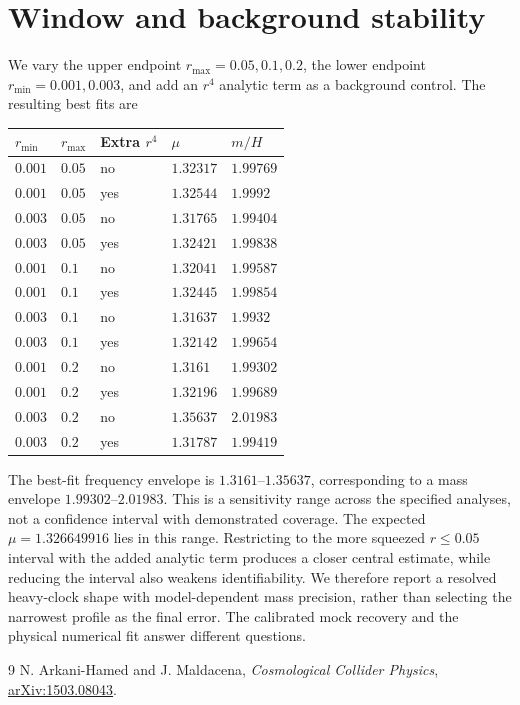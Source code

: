 \documentclass[11pt,a4paper]{article}
\begin{document}
\section{Window and background stability}
We vary the upper endpoint $r_{\max}=0.05,0.1,0.2$, the lower endpoint $r_{\min}=0.001,0.003$, and add an $r^4$ analytic term as a background control. The resulting best fits are
\begin{center}\small\begin{tabular}{lllll}\toprule $r_{\min}$ & $r_{\max}$ & Extra $r^4$ & $\mu$ & $m/H$\\\midrule
$0.001$ & $0.05$ & no & $1.32317$ & $1.99769$\\
$0.001$ & $0.05$ & yes & $1.32544$ & $1.9992$\\
$0.003$ & $0.05$ & no & $1.31765$ & $1.99404$\\
$0.003$ & $0.05$ & yes & $1.32421$ & $1.99838$\\
$0.001$ & $0.1$ & no & $1.32041$ & $1.99587$\\
$0.001$ & $0.1$ & yes & $1.32445$ & $1.99854$\\
$0.003$ & $0.1$ & no & $1.31637$ & $1.9932$\\
$0.003$ & $0.1$ & yes & $1.32142$ & $1.99654$\\
$0.001$ & $0.2$ & no & $1.3161$ & $1.99302$\\
$0.001$ & $0.2$ & yes & $1.32196$ & $1.99689$\\
$0.003$ & $0.2$ & no & $1.35637$ & $2.01983$\\
$0.003$ & $0.2$ & yes & $1.31787$ & $1.99419$\\\bottomrule\end{tabular}\end{center}
The best-fit frequency envelope is $1.3161$--$1.35637$, corresponding to a mass envelope $1.99302$--$2.01983$. This is a sensitivity range across the specified analyses, not a confidence interval with demonstrated coverage.
The expected $\mu=1.326649916$ lies in this range. Restricting to the more squeezed $r\le0.05$ interval with the added analytic term produces a closer central estimate, while reducing the interval also weakens identifiability. We therefore report a resolved heavy-clock shape with model-dependent mass precision, rather than selecting the narrowest profile as the final error. The calibrated mock recovery and the physical numerical fit answer different questions.\begin{thebibliography}{9}\small
{} N. Arkani-Hamed and J. Maldacena, \emph{Cosmological Collider Physics}, \href{https://arxiv.org/abs/1503.08043}{arXiv:1503.08043}.\end{thebibliography}
\end{document}
